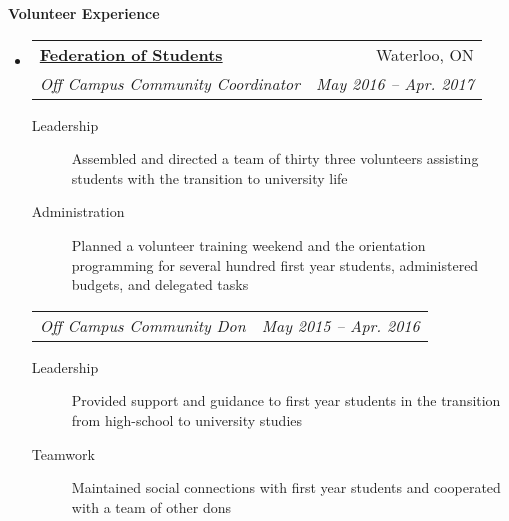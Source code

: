 \documentclass[letterpaper,11pt]{article}
\makeatletter
\newcommand{\resheading}[1]{\colorbox{resBlue}{\begin{minipage}{\textwidth}
			\textbf{#1}
\end{minipage}} \vspace{-14pt}}
\newcommand{\resitem}[4]{\begin{tabular*}{17.5cm}{l@{\extracolsep{\fill}}r} \textbf{#1} & #2 \\ \textit{#3} & \textit{#4} \\ \end{tabular*} \vspace{-6pt}}
\newcommand{\ressubitem}[2]{\begin{tabular*}{17.5cm}{l@{\extracolsep{\fill}}r} \textit{#1} & \textit{#2} \\ \end{tabular*} \vspace{-6pt}}
\makeatother
\begin{document}
\resheading{Volunteer Experience}
\begin{itemize}
\item 
	\resitem{\href{https://feds.ca/}{Federation of Students}}{Waterloo, ON}{Off Campus Community Coordinator}{May 2016 -- Apr. 2017}
		{\footnotesize \begin{description}
				\item[Leadership] Assembled and directed a team of thirty three volunteers assisting students with the transition to university life
				\item[Administration] {Planned a volunteer training weekend and the orientation programming for several hundred first year students, administered budgets, and delegated tasks}
			\end{description}}
	\ressubitem{Off Campus Community Don}{May 2015 -- Apr. 2016}
		{\footnotesize \begin{description}
				\item[Leadership] Provided support and guidance to first year students in the transition from high-school to university studies
				\item[Teamwork] Maintained social connections with first year students and cooperated with a team of other dons
			\end{description}}
\begin{comment}
\item
	\resitem{\href{http://www.sparkscience.ca/}{TELUS Spark}}{Calgary, AB}{Exhibit Gallery Volunteer}{July 2013 -- Aug. 2013}
		{\footnotesize \begin{description}
			\item[Customer Service] Interacted with visitors to the TELUS Spark Science Centre by explaining the scientific concepts behind a variety of exhibits; adapted interactions to suit customers of all ages and knowledge levels to provide a captivating visitor experience
		\end{description}}
\end{comment}
\end{itemize}
\end{document}
